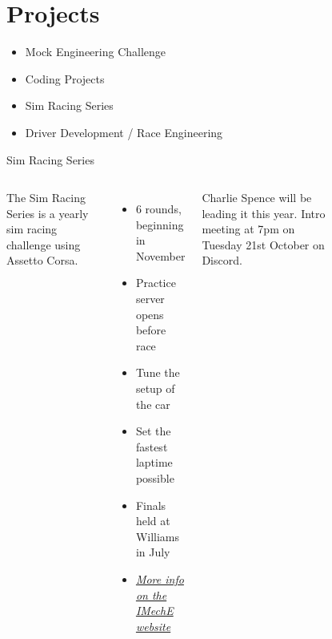 \section*{Projects}

\begin{frame}
    \begin{itemize}
        \item Mock Engineering Challenge
        \item Coding Projects
        \item Sim Racing Series
        \item Driver Development / Race Engineering
    \end{itemize}
\end{frame}

\begin{frame}{Sim Racing Series}
    \begin{columns}
        The Sim Racing Series is a yearly
        sim racing challenge using Assetto Corsa.
        \begin{itemize}
            \item 6 rounds, beginning in November
            \item Practice server opens before race
            \item Tune the setup of the car
            \item Set the fastest laptime possible
            \item Finals held at Williams in July
            \item \href{https://www.imeche.org/events/formula-student/team-information/fs-sim-racing}{\textit{More info on the IMechE website}}
        \end{itemize}
        Charlie Spence will be leading it this year.
        Intro meeting at 7pm on Tuesday 21st October on Discord.
        \begin{figure}

\end{figure}
\end{columns}
\end{frame}
